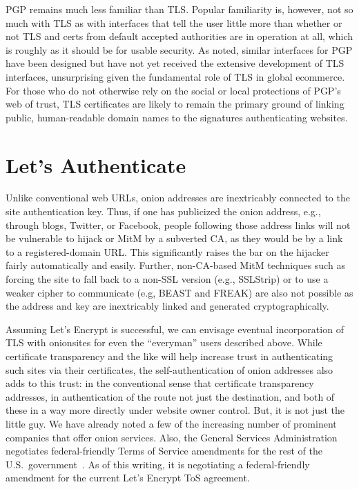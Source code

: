 \documentclass[10pt, conference, compsocconf]{styles/IEEEtran}
\begin{document}
PGP remains much less familiar than
TLS\@. Popular familiarity is, however, not so much with TLS as with
interfaces that tell the user little more than whether or not TLS 
and certs from default accepted authorities are
in operation at all, which is roughly as it should be for usable
security. As noted, similar interfaces for PGP have been designed but
have not yet received the extensive development of TLS interfaces,
unsurprising given the fundamental role of TLS in global ecommerce.
For those who do not otherwise rely on the social or local protections
of PGP's web of trust, TLS certificates are likely to remain the
primary ground of linking public, human-readable domain names to the
signatures authenticating websites.



\section{Let's Authenticate}
\label{lets-auth}

Unlike conventional web URLs, onion addresses are inextricably
connected to the site authentication key. Thus, if one has
publicized the onion address, e.g., through blogs, Twitter, or
Facebook, people following those address links will not be vulnerable
to hijack or MitM by a subverted CA, as they would be by a link
to a registered-domain URL\@. 
This significantly raises the bar on the hijacker
fairly automatically and easily. Further, non-CA-based MitM techniques
such as forcing the site to fall back to a non-SSL version (e.g.,
SSLStrip) or to use a weaker cipher to communicate (e.g, BEAST and
FREAK) are also not possible as the address and key are inextricably
linked and generated cryptographically. 

Assuming Let's Encrypt is successful, we can envisage eventual
incorporation of TLS with onionsites for even the ``everyman'' users
described above.  While certificate transparency and the like will
help increase trust in authenticating such sites via their
certificates, the self-authentication of onion addresses also adds to
this trust: in the conventional sense that certificate transparency
addresses, in authentication of the route not just the destination,
and both of these in a way more directly under website owner control. 
But, it is not just the little guy. We have already noted a few of the
increasing number of prominent companies that offer onion
services. Also, the General Services Administration negotiates
federal-friendly Terms of Service amendments for the rest of the U.S.\
government~\cite{gsa-tos}. As of this writing, it is negotiating a
federal-friendly amendment for the current Let's Encrypt ToS
agreement.
\end{document}
